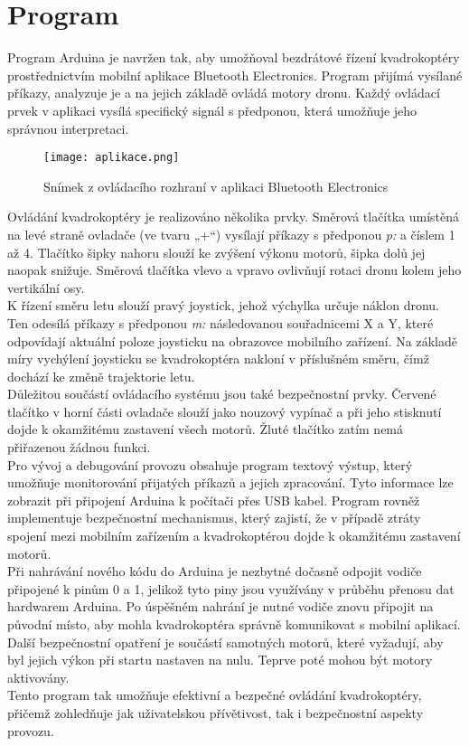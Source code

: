 \documentclass[12pt]{report}
\begin{document}
\chapter{Program}
Program Arduina je navržen tak, aby umožňoval bezdrátové řízení kvadrokoptéry prostřednictvím mobilní aplikace Bluetooth Electronics. Program přijímá vysílané příkazy, analyzuje je a na jejich základě ovládá motory dronu. Každý ovládací prvek v aplikaci vysílá specifický signál s předponou, která umožňuje jeho správnou interpretaci.\\
\begin{figure}[H]
	\centering
	\texttt{[image: aplikace.png]}
	\caption{Snímek z ovládacího rozhraní v aplikaci Bluetooth Electronics}
	\label{fig:aplikace.png}
\end{figure}
Ovládání kvadrokoptéry je realizováno několika prvky. Směrová tlačítka umístěná na levé straně ovladače (ve tvaru „+“) vysílají příkazy s předponou \textit{p:} a číslem 1 až 4. Tlačítko šipky nahoru slouží ke zvýšení výkonu motorů, šipka dolů jej naopak snižuje. Směrová tlačítka vlevo a vpravo ovlivňují rotaci dronu kolem jeho vertikální osy.\\
K řízení směru letu slouží pravý joystick, jehož výchylka určuje náklon dronu. Ten odesílá příkazy s předponou \textit{m:} následovanou souřadnicemi X a Y, které odpovídají aktuální poloze joysticku na obrazovce mobilního zařízení. Na základě míry vychýlení joysticku se kvadrokoptéra nakloní v příslušném směru, čímž dochází ke změně trajektorie letu.\\
Důležitou součástí ovládacího systému jsou také bezpečnostní prvky. Červené tlačítko v horní části ovladače slouží jako nouzový vypínač a při jeho stisknutí dojde k okamžitému zastavení všech motorů. Žluté tlačítko zatím nemá přiřazenou žádnou funkci.\\
Pro vývoj a debugování provozu obsahuje program textový výstup, který umožňuje monitorování přijatých příkazů a jejich zpracování. Tyto informace lze zobrazit při připojení Arduina k počítači přes USB kabel. Program rovněž implementuje bezpečnostní mechanismus, který zajistí, že v případě ztráty spojení mezi mobilním zařízením a kvadrokoptérou dojde k okamžitému zastavení motorů.\\
Při nahrávání nového kódu do Arduina je nezbytné dočasně odpojit vodiče připojené k pinům 0 a 1, jelikož tyto piny jsou využívány v průběhu přenosu dat hardwarem Arduina. Po úspěšném nahrání je nutné vodiče znovu připojit na původní místo, aby mohla kvadrokoptéra správně komunikovat s mobilní aplikací. Další bezpečnostní opatření je součástí samotných motorů, které vyžadují, aby byl jejich výkon při startu nastaven na nulu. Teprve poté mohou být motory aktivovány.\\
Tento program tak umožňuje efektivní a bezpečné ovládání kvadrokoptéry, přičemž zohledňuje jak uživatelskou přívětivost, tak i bezpečnostní aspekty provozu.
\end{document}

